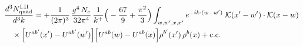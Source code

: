 \begingroup\small
\begin{align}\label{eq:H-I.II-2o}
&\frac{d^{3}N^{\rm I.II}_{{\rm quad}}}{d^{3}k}=+\frac{1}{(2\pi)^{3}}\, \frac{g^{4}\,N_{c}}{32\pi^{4}}\, \frac{1}{k^{+}}\Big(-\frac{67}{9}+\frac{\pi^{2}}{3}\Big) \int_{w,w',x,x'} e^{-ik\cdot(w-w')}\;\mathcal{K}(x'-w')\cdot\mathcal{K}(x-w)\notag\\
&\quad \times\Big[U^{ab'}(x')-U^{ab'}(w')\Big]\Big[U^{ab}(w)-U^{ab}(x)\Big]\rho^{b'}(x')\, \rho^{b}(x) + {\rm c.c.}
\end{align}
\endgroup
